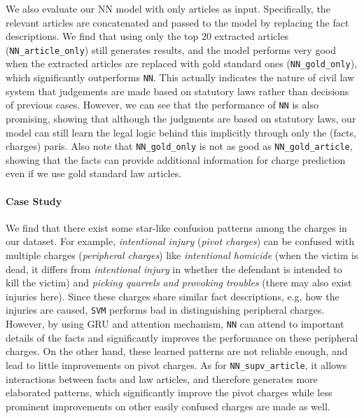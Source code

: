 We also evaluate our NN model with only articles as input. Specifically, the relevant articles are concatenated and passed to the model by replacing the fact descriptions. We find that using only the top 20 extracted articles (\texttt{NN\_article\_only}) still generates  results, and the model performs very good when the extracted articles are replaced with gold standard ones (\texttt{NN\_gold\_only}), which significantly outperforms \texttt{NN}. 
This actually indicates the nature of civil law system that judgements are made based on statutory laws rather than decisions of previous cases.
However, we can see that the performance of \texttt{NN} is also promising, showing that although the judgments are based on statutory laws, our model can still learn the legal logic behind this implicitly through only the (facts, charges) paris. 
Also note that \texttt{NN\_gold\_only} is not as good as \texttt{NN\_gold\_article}, showing that the facts can provide additional information for charge prediction even if we use gold standard law articles.


\paragraph{Case Study}
We find that there exist some star-like confusion patterns among the charges in our dataset. For example, \emph{intentional injury} (\emph{pivot charges}) can be confused with multiple charges (\emph{peripheral charges}) like \emph{intentional homicide} (when the victim is dead, it differs from \emph{intentional injury} in whether the defendant is intended to kill the victim) and \emph{picking quarrels and provoking troubles} (there may also exist injuries here). 
Since these charges share similar fact descriptions, e.g, how the injuries are caused, \texttt{SVM} performs bad in distinguishing peripheral charges.  
However, by using GRU and attention mechanism, \texttt{NN} can attend to important details of the facts and significantly improves the performance on these peripheral charges. 
On the other hand, these learned patterns are not reliable enough, and lead to little improvements on pivot charges.
As for \texttt{NN\_supv\_article}, it allows interactions between facts and law articles, and therefore generates more elaborated patterns, which significantly improve the pivot charges while less prominent improvements on other easily confused charges are made as well.

